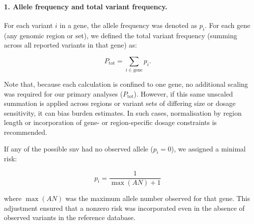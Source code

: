 \paragraph{1. Allele frequency and total variant frequency.} 
\label{sec:min_risk}
For each variant \(i\) in a gene, the allele frequency was denoted as \(p_i\). For each gene (any genomic region or set), we defined the total variant frequency (summing across all reported variants in that gene) as:

\[P_{\text{tot}} = \sum_{i \in \text{gene}} p_i.\]

Note that, because each calculation is confined to one gene, no additional scaling was required for our primary analyses (\(P_{\text{tot}}\)). However, if this same unscaled summation is applied across regions or variant sets of differing size or dosage sensitivity, it can bias burden estimates. In such cases, normalisation by region length or incorporation of gene- or region-specific dosage constraints is recommended.

If any of the possible \ac{snv}  had no observed allele (\(p_i = 0\)), we assigned a minimal risk:

\[p_i = \frac{1}{\max(AN) + 1}\]

where \(\max(AN)\) was the maximum allele number observed for that gene. This adjustment ensured that a nonzero risk was incorporated even in the absence of observed variants in the reference database.


